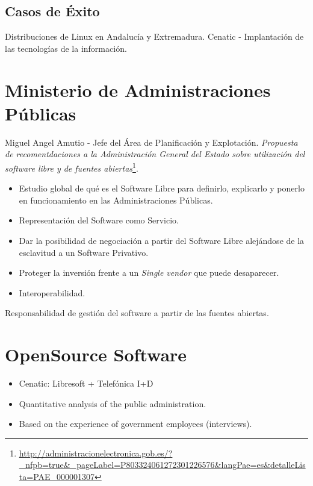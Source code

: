 \documentclass[11pt]{scrartcl}
\begin{document}
\subsection{Casos de \'Exito}
\label{sub:success}

Distribuciones de Linux en Andaluc\'ia y Extremadura.
Cenatic - Implantaci\'on de las tecnolog\'ias de la informaci\'on.


\section{Ministerio de Administraciones P\'ublicas}
\label{sec:map}

Miguel Angel Amutio - Jefe del \'Area de Planificaci\'on y Explotaci\'on. \emph{Propuesta de recomentdaciones a la Administraci\'on General del Estado sobre utilizaci\'on del software libre y de fuentes abiertas}\footnote{\url{http://administracionelectronica.gob.es/?_nfpb=true&_pageLabel=P803324061272301226576&langPae=es&detalleLista=PAE_000001307}}.

\begin{itemize}
	\item Estudio global de qu\'e es el Software Libre para definirlo, explicarlo y ponerlo en funcionamiento en las Administraciones P\'ublicas.
	\item Representaci\'on del Software como Servicio.
	\item Dar la posibilidad de negociaci\'on a partir del Software Libre alej\'andose de la esclavitud a un Software Privativo.
	\item Proteger la inversi\'on frente a un \emph{Single vendor} que puede desaparecer.
	\item Interoperabilidad.
\end{itemize}

\par Responsabilidad de gesti\'on del software a partir de las fuentes abiertas.


\section{OpenSource Software}
\label{sec:floss-2008}

\begin{itemize}
	\item Cenatic: Libresoft + Telef\'onica I+D
	\item Quantitative analysis of the public administration.
	\item Based on the experience of government employees (interviews).
\end{itemize}



\end{document}
